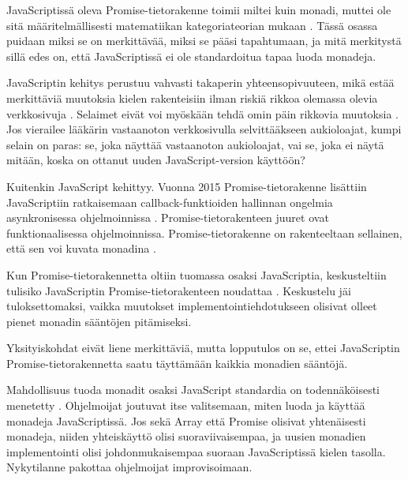 JavaScriptissä oleva Promise-tietorakenne toimii miltei kuin monadi, muttei ole sitä määritelmällisesti matematiikan kategoriateorian mukaan \cite{stackoverflow:why_monad,promises-spec-94}. Tässä osassa puidaan miksi se on merkittävää, miksi se pääsi tapahtumaan, ja mitä merkitystä sillä edes on, että JavaScriptissä ei ole standardoitua tapaa luoda monadeja.

JavaScriptin kehitys perustuu vahvasti takaperin yhteensopivuuteen, mikä estää merkittäviä muutoksia kielen rakenteisiin ilman riskiä rikkoa olemassa olevia verkkosivuja \cite{prototype_library_trends}. Selaimet eivät voi myöskään tehdä omin päin rikkovia muutoksia \cite{against_self_closing_tags,proposal-joint-iteration}. Jos vierailee lääkärin vastaanoton verkkosivulla selvittääkseen aukioloajat, kumpi selain on paras: se, joka näyttää vastaanoton aukioloajat, vai se, joka ei näytä mitään, koska on ottanut uuden JavaScript-version käyttöön?

Kuitenkin JavaScript kehittyy. Vuonna 2015 Promise-tietorakenne lisättiin JavaScriptiin ratkaisemaan callback-funktioiden hallinnan ongelmia asynkronisessa ohjelmoinnissa \cite{mdn_promise,callbackhell}. Promise-tietorakenteen juuret ovat funktionaalisessa ohjelmoinnissa. Promise-tietorakenne on rakenteeltaan sellainen, että sen voi kuvata monadina \cite{promises-spec-94,stackoverflow:why_monad}.

Kun Promise-tietorakennetta oltiin tuomassa osaksi JavaScriptia, keskusteltiin tulisiko JavaScriptin Promise-tietorakenteen noudattaa  \cite{promises-spec-94}. Keskustelu jäi tuloksettomaksi, vaikka muutokset implementointiehdotukseen olisivat olleet pienet monadin sääntöjen pitämiseksi.

Yksityiskohdat eivät liene merkittäviä, mutta lopputulos on se, ettei JavaScriptin Promise-tietorakennetta saatu täyttämään kaikkia monadien sääntöjä.

Mahdollisuus tuoda monadit osaksi JavaScript standardia on todennäköisesti menetetty \cite{proposal-joint-iteration,prototype_library_trends}. Ohjelmoijat joutuvat itse valitsemaan, miten luoda ja käyttää monadeja JavaScriptissä. Jos sekä Array että Promise olisivat yhtenäisesti monadeja, niiden yhteiskäyttö olisi suoraviivaisempaa, ja uusien monadien implementointi olisi johdonmukaisempaa suoraan JavaScriptissä kielen tasolla. Nykytilanne pakottaa ohjelmoijat improvisoimaan.
